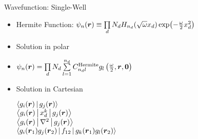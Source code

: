 \documentclass[10pt, t, xcolor=dvipsnames]{beamer}
\begin{document}
\begin{frame}[fragile]{Wavefunction: Single-Well}
    \begin{itemize}
        \item Hermite Function: $\psi_n(\bm{{r}}) \equiv \prod\limits_d N_d
            H_{n_d}(\sqrt{\omega}x_d)\exp(-\frac{\omega}{2}x^2_d)$
        \item Solution in polar
        \item $\psi_n(\bm{{r}}) = \prod\limits_d N_d \sum\limits^{n_d}_{l=1}
            C^{\text{Hermite}}_{n_dl}
            g_l\left(\frac{\omega}{2},\bm{{r}},\bm{{0}}\right)$
        \item Solution in Cartesian \\ \vspace{0.2cm} \hspace{1cm}
            \begin{minipage}[H]{0.5\textwidth}
                $\Braket{g_i(\bm{{r}})|g_j(\bm{{r}})}$ \vsp \\
                $\Braket{g_i(\bm{{r}})|x^k_d|g_j(\bm{{r}})}$ \vsp \\
                $\Braket{g_i(\bm{{r}})|\nabla^2|g_j(\bm{{r}})}$ \vsp \\
                $\Braket{g_i(\bm{{r}}_1)g_j(\bm{{r}}_2)|f_{12}|g_k(\bm{{r}}_1)g_l(\bm{{r}}_2)}$ \\
            \end{minipage}
    \end{itemize}
\end{frame}
\end{document}
